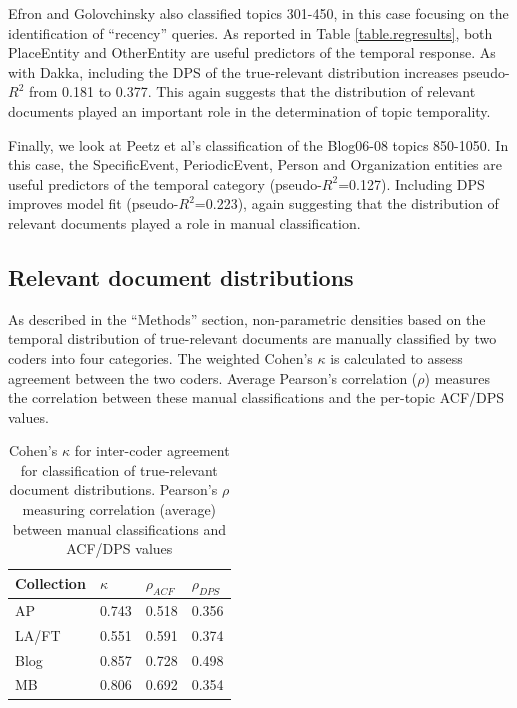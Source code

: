 \documentclass{asist}
\begin{document}
Efron and Golovchinsky \cite{Efron2011} also classified topics 301-450, in this case focusing on the identification of ``recency'' queries. As reported in Table \ref{table.regresults}, both PlaceEntity and OtherEntity are useful predictors of the temporal response. As with Dakka, including the DPS of the true-relevant distribution increases pseudo-$R^2$ from 0.181 to 0.377. This again suggests that the distribution of relevant documents played an important role in the determination of topic temporality.

Finally, we look at Peetz et al's \cite{Peetz2013a} classification of the Blog06-08 topics 850-1050. In this case, the SpecificEvent, PeriodicEvent, Person and Organization entities are useful predictors of the temporal category (pseudo-$R^2$=0.127). Including DPS  improves model fit (pseudo-$R^2$=0.223), again suggesting that the distribution of relevant documents played a role in manual classification.

\subsection{Relevant document distributions}

As described in the ``Methods'' section, non-parametric densities based on the temporal distribution of true-relevant documents are manually classified by two coders into four categories.  The weighted Cohen's $\kappa$ is calculated to assess agreement between the two coders.  Average Pearson's correlation ($\rho$) measures the correlation between these manual classifications and the per-topic ACF/DPS values.  

\begin{table}
\centering
\begin{tabular}{| l | l | l | l | } \hline
\bf{Collection} & \bf{$\kappa$}  & \bf{$\rho_{ACF}$} & \bf{$\rho_{DPS}$} \\ \hline
AP 	   & 0.743 & 0.518 & 0.356 \\ \hline
LA/FT & 0.551 & 0.591 & 0.374 \\ \hline
Blog    & 0.857 & 0.728 & 0.498 \\ \hline
MB      & 0.806 & 0.692 & 0.354 \\ \hline 
\end{tabular}
\caption{Cohen's $\kappa$ for inter-coder agreement for classification of true-relevant document distributions. Pearson's $\rho$ measuring correlation (average) between manual classifications and ACF/DPS values}
\label{table.cor}
\end{table}
\end{document}
